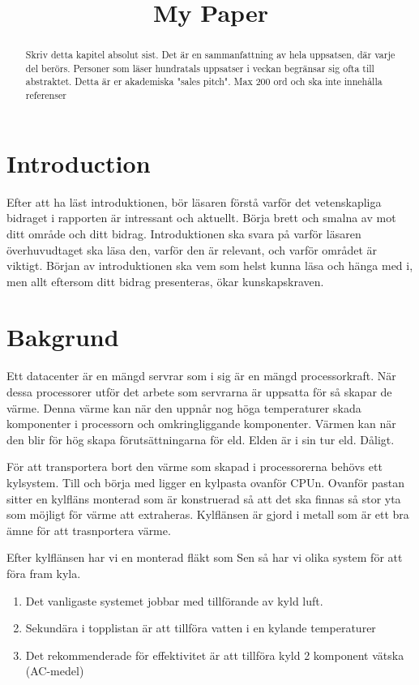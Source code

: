 \documentclass[conference,a4paper]{IEEEtran}
\begin{document}
\title{My Paper}
\author{
}
\maketitle
\begin{abstract}
Skriv detta kapitel absolut sist. Det är en sammanfattning av hela uppsatsen,
där varje del berörs. Personer som läser hundratals uppsatser i veckan begränsar
sig ofta till abstraktet. Detta är er akademiska "sales pitch". Max 200 ord och ska
inte innehålla referenser
\end{abstract}
\section{Introduction}
Efter att ha läst introduktionen, bör läsaren förstå varför det vetenskapliga
bidraget i rapporten är intressant och aktuellt. Börja brett och smalna av mot ditt
område och ditt bidrag. Introduktionen ska svara på varför läsaren överhuvudtaget
ska läsa den, varför den är relevant, och varför området är viktigt. Början av
introduktionen ska vem som helst kunna läsa och hänga med i, men allt eftersom ditt
bidrag presenteras, ökar kunskapskraven.
\section{Bakgrund}
Ett datacenter är en mängd servrar som i sig är en mängd processorkraft. När dessa processorer
utför det arbete som servrarna är uppsatta för så skapar de värme. Denna värme kan när den uppnår
nog höga temperaturer skada komponenter i processorn och omkringliggande komponenter. Värmen kan 
när den blir för hög skapa förutsättningarna för eld. Elden är i sin tur eld. Dåligt.

För att transportera bort den värme som skapad i processorerna behövs ett kylsystem. Till och börja med 
ligger en kylpasta ovanför CPUn. Ovanför pastan sitter en kylfläns monterad som är konstruerad så att det
ska finnas så stor yta som möjligt för värme att extraheras. Kylflänsen är gjord i metall som är ett bra 
ämne för att trasnportera värme. 

Efter kylflänsen har vi en monterad fläkt som 
Sen så har vi olika system för att föra fram kyla.  
\begin{enumerate}
    \item Det vanligaste systemet jobbar med tillförande av kyld luft.
    \item Sekundära i topplistan är att tillföra vatten i en kylande temperaturer
    \item Det rekommenderade för effektivitet är att tillföra kyld 2 komponent vätska (AC-medel)
\end{enumerate}
\end{document}
